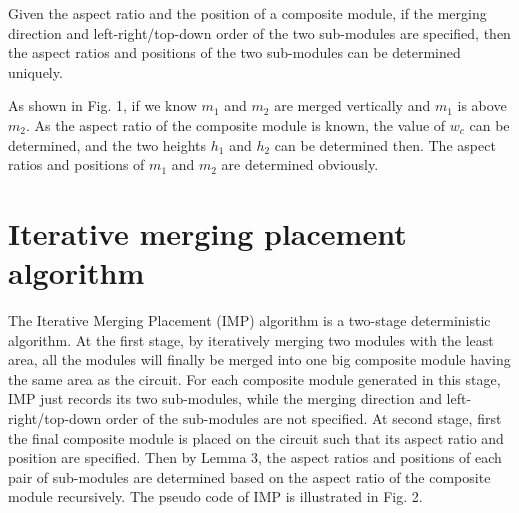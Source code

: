 \documentclass[conference]{IEEEtran}
\begin{document}
\begin{lemma}
Given the aspect ratio and the position of a composite module, if the merging direction and left-right/top-down order of the two sub-modules are specified, then the aspect ratios and positions of the two sub-modules can be determined uniquely.
\end{lemma}

As shown in Fig. 1, if we know $m_1$ and $m_2$ are merged vertically and $m_1$ is above $m_2$. As the aspect ratio of the composite module is known, the value of $w_c$ can be determined, and the two heights $h_1$ and $h_2$ can be determined then. The aspect ratios and positions of $m_1$ and $m_2$ are determined obviously.


\section{Iterative merging placement algorithm}

The Iterative Merging Placement (IMP) algorithm is a two-stage deterministic algorithm. At the first stage, by iteratively merging two modules with the least area, all the modules will finally be merged into one big composite module having the same area as the circuit. For each composite module generated in this stage, IMP just records its two sub-modules, while the merging direction and left-right/top-down order of the sub-modules are not specified. At second stage, first the final composite module is placed on the circuit such that its aspect ratio and position are specified. Then by Lemma 3, the aspect ratios and positions of each pair of sub-modules are determined based on the aspect ratio of the composite module recursively. The pseudo code of IMP is illustrated in Fig. 2.
\end{document}
